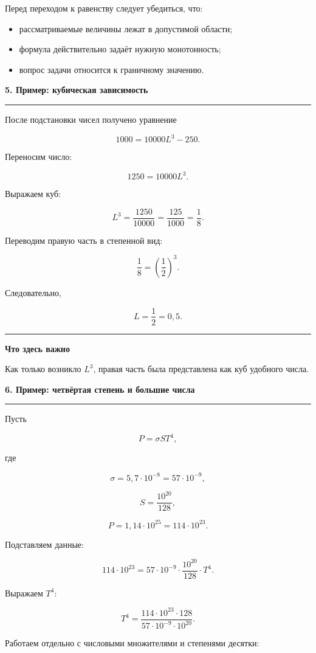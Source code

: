 \documentclass[a4paper,12pt]{article}
\newcommand{\topic}[1]{%
  \vspace{0.5em}
  {\Large\bfseries\color{darkaccent}#1}\par
  \vspace{0.25em}
  {\color{accent}\rule{\linewidth}{0.7pt}}\par
  \vspace{0.6em}
}
\newcommand{\keyidea}[1]{%
  \par\medskip
  {\color{accent}\rule{8mm}{1.2pt}}\quad
  \textbf{#1}
  \par\smallskip
}
\begin{document}
Перед переходом к равенству следует убедиться, что:

\begin{itemize}
  \item рассматриваемые величины лежат в допустимой области;
  \item формула действительно задаёт нужную монотонность;
  \item вопрос задачи относится к граничному значению.
\end{itemize}

\topic{5. Пример: кубическая зависимость}

После подстановки чисел получено уравнение

\[
1000=10000L^3-250.
\]

Переносим число:

\[
1250=10000L^3.
\]

Выражаем куб:

\[
L^3=\frac{1250}{10000}
=\frac{125}{1000}
=\frac18.
\]

Переводим правую часть в степенной вид:

\[
\frac18=\left(\frac12\right)^3.
\]

Следовательно,

\[
L=\frac12=0{,}5.
\]

\keyidea{Что здесь важно}

Как только возникло \(L^3\), правая часть была представлена как
куб удобного числа.

\topic{6. Пример: четвёртая степень и большие числа}

Пусть

\[
P=\sigma ST^4,
\]

где

\[
\sigma=5{,}7\cdot10^{-8}
      =57\cdot10^{-9},
\]

\[
S=\frac{10^{20}}{128},
\]

\[
P=1{,}14\cdot10^{25}
 =114\cdot10^{23}.
\]

Подставляем данные:

\[
114\cdot10^{23}
=
57\cdot10^{-9}
\cdot
\frac{10^{20}}{128}
\cdot T^4.
\]

Выражаем \(T^4\):

\[
T^4
=
\frac{
114\cdot10^{23}\cdot128
}{
57\cdot10^{-9}\cdot10^{20}
}.
\]

Работаем отдельно с числовыми множителями и степенями десятки:
\end{document}
